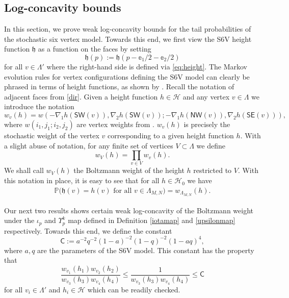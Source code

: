 \documentclass[reqno,11pt]{amsart}
\newcommand{\h}{\mathfrak{h}}
\renewcommand{\Pr}{\mathbb{P}}
\numberwithin{equation}{section}
\theoremstyle{definition}
\begin{document}
\subsection{Log-concavity bounds}\label{sec3.2} In this section, we prove weak log-concavity bounds for the tail probabilities of the stochastic six vertex model. Towards this end, we first view the S6V height function $\h$ as a function on the faces by setting $$\h(p):=\h(p-\mathbb{e}_1/2-\mathbb{e}_2/2)$$ for all $v\in \Lambda'$ where the right-hand side is defined via \eqref{eq:height}. The Markov evolution rules for vertex configurations defining the S6V model can clearly be phrased in terms of height functions, as shown by . Recall the notation of adjacent faces from \eqref{dir}. Given a height function $h \in \mathscr{H}$ and any vertex $v \in \Lambda$ we introduce the notation
    \begin{equation*}
        w_{v}(h) = w \left( -\nabla_1 h (\mathsf{SW}(v) ), \nabla_2 h(\mathsf{SW}(v)) ; -\nabla_1 h(\mathsf{NW}(v)), \nabla_2 h(\mathsf{SE}(v))  \right),
    \end{equation*}
where  $w(i_1,j_1;i_2,j_2)$ are vertex weights from . $w_v(h)$ is precisely the stochastic weight of the vertex $v$  corresponding to a given height function $h$. With a slight abuse of notation, for any finite set of vertices $V \subset \Lambda$ we define
    \begin{equation*}
        w_{V}(h) = \prod_{v \in V} w_{v}(h).
    \end{equation*}
We shall call $w_{V}(h)$ the Boltzmann weight of the height $h$ restricted to $V$. With this notation in place, it is easy to see that for all $h \in \mathscr{H}_0^{}$ we have
\begin{align}\label{probs6v}
    \Pr\big(\h(v)=h(v) \mbox{ for all } v\in \Lambda_{M,N}\big)=w_{\Lambda_{M,N}}(h).
\end{align}

\medskip


Our next two results shows certain weak log-concavity of the Boltzmann weight under the $\iota_p$ and $\Upsilon_p^k$ map defined in Definition \ref{iotamap} and \ref{upsilonmap} respectively.
Towards this end, we define the constant
\begin{equation} \label{eq:constant c}
    \mathsf{C} := a^{-2}q^{-2}(1-a)^{-2}(1-q)^{-2}(1-aq)^{4},
\end{equation}
where $a,q$ are the parameters of the S6V model. This constant has the property that
\begin{equation} \label{cineq}
    \frac{w_{v_1}(h_1)w_{v_2}(h_2)}{w_{v_3}(h_3)w_{v_4}(h_4)} \le \frac{1}{w_{v_3}(h_3)w_{v_4}(h_4)}  \le \mathsf{C}
\end{equation}
for all $v_i\in \Lambda'$ and $h_i\in \mathscr{H}$ which can be readily checked. 
\end{document}
